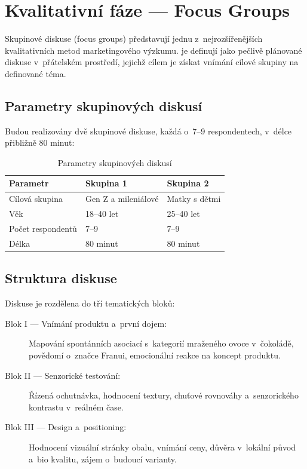 \section{Kvalitativní fáze — Focus Groups}
\label{sec:meth_focus_groups}

Skupinové diskuse (focus groups) představují jednu z~nejrozšířenějších kvalitativních metod marketingového výzkumu. \textcite{krueger_casey_2015} je definují jako pečlivě plánované diskuse v~přátelském prostředí, jejichž cílem je získat vnímání cílové skupiny na definované téma.

\subsection{Parametry skupinových diskusí}

Budou realizovány dvě skupinové diskuse, každá o~7--9 respondentech, v~délce přibližně 80 minut:

\begin{table}[H]
\centering
\caption{Parametry skupinových diskusí}
\label{tab:fgd_params}
\begin{tabular}{lll}
\toprule
\textbf{Parametr} & \textbf{Skupina 1} & \textbf{Skupina 2} \\
\midrule
Cílová skupina & Gen Z a mileniálové & Matky s dětmi \\
Věk & 18--40 let & 25--40 let \\
Počet respondentů & 7--9 & 7--9 \\
Délka & 80 minut & 80 minut \\
\bottomrule
\end{tabular}
\end{table}

\subsection{Struktura diskuse}

Diskuse je rozdělena do tří tematických bloků:

\begin{description}
  \item[Blok I — Vnímání produktu a~první dojem:] Mapování spontánních asociací s~kategorií mraženého ovoce v~čokoládě, povědomí o~značce Franui, emocionální reakce na koncept produktu.
  \item[Blok II — Senzorické testování:] Řízená ochutnávka, hodnocení textury, chuťové rovnováhy a~senzorického kontrastu v~reálném čase.
  \item[Blok III — Design a~positioning:] Hodnocení vizuální stránky obalu, vnímání ceny, důvěra v~lokální původ a~\gls{bio} kvalitu, zájem o~budoucí varianty.
\end{description}

